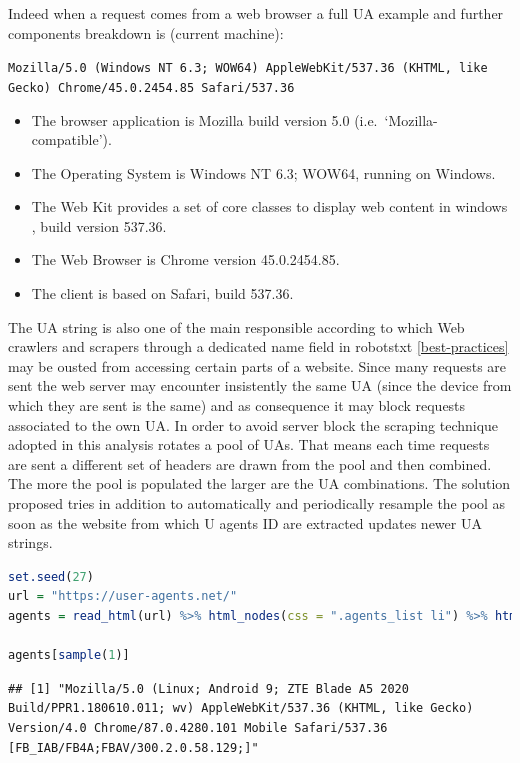 \documentclass[
  12pt,
  a4paper,
  oneside]{book}
\newcommand{\passthrough}[1]{#1}
\providecommand{\tightlist}{%
  \setlength{\itemsep}{0pt}\setlength{\parskip}{0pt}}
\theoremstyle{definition}
\theoremstyle{definition}
\theoremstyle{definition}
\theoremstyle{remark}
\begin{document}
Indeed when a request comes from a web browser a full UA example and further components breakdown is (current machine):

\passthrough{\lstinline!Mozilla/5.0 (Windows NT 6.3; WOW64) AppleWebKit/537.36 (KHTML, like Gecko) Chrome/45.0.2454.85 Safari/537.36!}

\begin{itemize}
\tightlist
\item
  The browser application is Mozilla build version 5.0 (i.e.~`Mozilla-compatible').
\item
  The Operating System is Windows NT 6.3; WOW64, running on Windows.
\item
  The Web Kit provides a set of core classes to display web content in windows \citep{UserAgen23}, build version 537.36.
\item
  The Web Browser is Chrome version 45.0.2454.85.
\item
  The client is based on Safari, build 537.36.
\end{itemize}

The UA string is also one of the main responsible according to which Web crawlers and scrapers through a dedicated name field in robotstxt \ref{best-practices} may be ousted from accessing certain parts of a website. Since many requests are sent the web server may encounter insistently the same UA (since the device from which they are sent is the same) and as consequence it may block requests associated to the own UA. In order to avoid server block the scraping technique adopted in this analysis rotates a pool of UAs. That means each time requests are sent a different set of headers are drawn from the pool and then combined. The more the pool is populated the larger are the UA combinations. The solution proposed tries in addition to automatically and periodically resample the pool as soon as the website from which U agents ID are extracted updates newer UA strings.

\begin{lstlisting}[language=R]
set.seed(27)
url = "https://user-agents.net/"
agents = read_html(url) %>% html_nodes(css = ".agents_list li") %>% html_text()

agents[sample(1)]
\end{lstlisting}

\begin{lstlisting}
## [1] "Mozilla/5.0 (Linux; Android 9; ZTE Blade A5 2020 Build/PPR1.180610.011; wv) AppleWebKit/537.36 (KHTML, like Gecko) Version/4.0 Chrome/87.0.4280.101 Mobile Safari/537.36 [FB_IAB/FB4A;FBAV/300.2.0.58.129;]"
\end{lstlisting}
\end{document}
